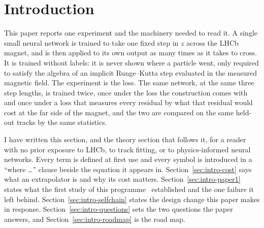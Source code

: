 \documentclass[11pt,a4paper]{article}
\newcommand{\um}{\ensuremath{\,\mu\mathrm{m}}}
\newcommand{\mm}{\ensuremath{\,\mathrm{mm}}}
\begin{document}
\begin{abstract}
second is weak: the pooled-loss counterpart has since cleared it too. The
price is specific: below the crossover between $3$--$8$ and $8$--$20$ GeV the
reweighted network is worse in five of six comparisons (these counts run over
three matched pairs, and two of the three pooled counterparts had not reached
the plateau rule), the median below
$3$ GeV rises from $353.7$ to $615.1\um$, the $95$th percentile from $898$ to
$1399\um$, and the fraction beyond a millimetre from $4.41$ to
$7.16$ per cent. The whole of the gain is in the bending plane, the vertical
plane does not move, and what remains is \emph{more} coherent along the chain
in all six matched comparisons, $0.31$ to $0.53$ against the $0.0625$ to
$0.125$ of independent steps. Shortening the step from $80.9$ to $20.2\mm$
halves each step's error and does not improve the crossing. Against
the simulated particle, network and reference are indistinguishable: the three
cost-weighted networks sit $12.5$ to $25.2$ times closer to one another than
either is to the truth in every band from $<3$ to $20$--$50$ GeV and in the
loss window, because neither models the material. In the thirty-track
$>50$ GeV band the pooled networks instead approach the reference-to-truth
gap, the ratio falling to $0.85$.
\end{abstract}

\tableofcontents

\section{Introduction}
\label{sec:intro}

This paper reports one experiment and the machinery needed to read it. A single
small neural network is trained to take one fixed step in $z$ across the LHCb
magnet, and is then applied to its own output as many times as it takes to
cross. It is trained without labels: it is never shown where a particle went,
only required to satisfy the algebra of an implicit Runge--Kutta step evaluated
in the measured magnetic field. The experiment is the loss. The same network,
at the same three step lengths, is trained twice, once under the loss the
construction comes with and once under a loss that measures every residual by
what that residual would cost at the far side of the magnet, and the two are
compared on the same held-out tracks by the same statistics.

I have written this section, and the theory section that follows it, for a
reader with no prior exposure to LHCb, to track fitting, or to
physics-informed neural networks. Every term is defined at first use and every
symbol is introduced in a ``where \dots'' clause beside the equation it appears
in. Section~\ref{sec:intro-cost} says what an extrapolator is and why its cost
matters. Section~\ref{sec:intro-paper1} states what the first study of this
programme~\citep{scriven2026lhcb1} established and the one failure it left
behind. Section~\ref{sec:intro-selfchain} states the design change this paper
makes in response. Section~\ref{sec:intro-questions} sets the two questions the
paper answers, and Section~\ref{sec:intro-roadmap} is the road map.
\end{document}
